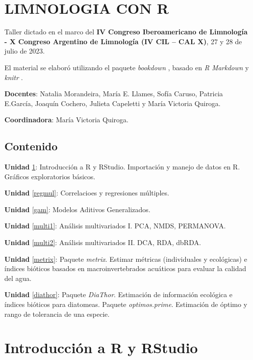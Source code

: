 \documentclass[
]{book}
\author{}
\date{\vspace{-2.5em}}
\begin{document}
{
\setcounter{tocdepth}{1}
\tableofcontents
}
\hypertarget{limnologia-con-r}{%
\chapter*{LIMNOLOGIA CON R}\label{limnologia-con-r}}

Taller dictado en el marco del \textbf{IV Congreso Iberoamericano de Limnología - X Congreso Argentino de Limnología (IV CIL -- CAL X)}, 27 y 28 de julio de 2023.

El material se elaboró utilizando el paquete \emph{bookdown} \citep{R-bookdown, bookdown2016}, basado en \emph{R Markdown} \citep{rmarkdown2020} y \emph{knitr} \citep{xie2015}.

\textbf{Docentes}: Natalia Morandeira, María E. Llames, Sofía Caruso, Patricia E.García, Joaquín Cochero, Julieta Capeletti y María Victoria Quiroga.

\textbf{Coordinadora}: María Victoria Quiroga.

\hypertarget{contenido}{%
\section{Contenido}\label{contenido}}

\textbf{Unidad} \ref{intro}: Introducción a R y RStudio. Importación y manejo de datos en R. Gráficos exploratorios básicos.

\textbf{Unidad} \ref{regmul}: Correlacioes y regresiones múltiples.

\textbf{Unidad} \ref{gam}: Modelos Aditivos Generalizados.

\textbf{Unidad} \ref{multi1}: Análisis multivariados I. PCA, NMDS, PERMANOVA.

\textbf{Unidad} \ref{multi2}: Análisis multivariados II. DCA, RDA, dbRDA.

\textbf{Unidad} \ref{metrix}: Paquete \emph{metrix}. Estimar métricas (individuales y ecológicas) e índices bióticos basados en macroinvertebrados acuáticos para evaluar la calidad del agua.

\textbf{Unidad} \ref{diathor}: Paquete \emph{DiaThor}. Estimación de información ecológica e índices bióticos para diatomeas. Paquete \emph{optimos.prime}. Estimación de óptimo y rango de tolerancia de una especie.

\hypertarget{intro}{%
\chapter{Introducción a R y RStudio}\label{intro}}
\end{document}
